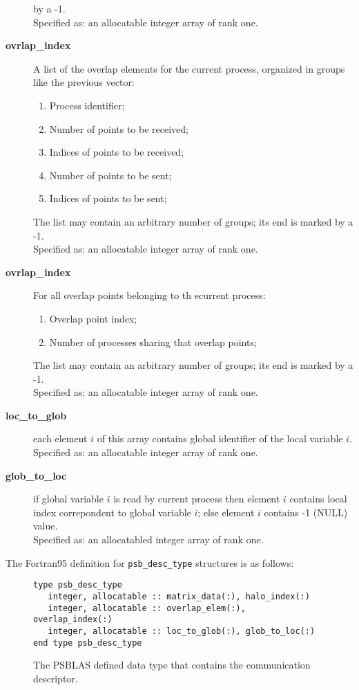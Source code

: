 \begin{description}
by a -1.\\
Specified as: an allocatable integer array of rank one.
\item [{\bf ovrlap\_index}] A list of the overlap elements for the
current process, organized in groups like the previous vector:
\begin{enumerate}
\item Process identifier;
\item Number of points to be received;
\item Indices of points to be received;
\item Number of points to be sent;
\item Indices of points to be sent;
\end{enumerate}
The list may contain an arbitrary number of groups; its end is marked
by a -1.\\
Specified as: an allocatable integer array  of rank one.
\item [{\bf ovrlap\_index}] For all overlap points belonging to th
ecurrent process:
\begin{enumerate}
\item  Overlap point index;
\item  Number of processes sharing that overlap points;
\end{enumerate}
The list may contain an arbitrary number of groups; its end is marked
by a -1.\\
Specified as: an allocatable integer array of rank one.
\item[{\bf loc\_to\_glob}] each element $i$ of this array contains
global identifier of the local variable $i$.\\
Specified as: an allocatable integer array of rank one.
\item[{\bf glob\_to\_loc}]  if global variable $i$ is read by current
process then element $i$ contains local index correpondent to global variable $i$;
else element $i$ contains -1 (NULL) value.\\
Specified as: an allocatabled integer array of rank one.
\end{description}
The Fortran95 definition  for \verb|psb_desc_type| structures is 
as follows:
\begin{figure}[h!]
  \begin{Sbox}
    \begin{minipage}[tl]{0.9\textwidth}
\begin{verbatim} 
type psb_desc_type 
   integer, allocatable :: matrix_data(:), halo_index(:)
   integer, allocatable :: overlap_elem(:), overlap_index(:)
   integer, allocatable :: loc_to_glob(:), glob_to_loc(:)
end type psb_desc_type 
\end{verbatim}
    \end{minipage}
  \end{Sbox}
  \setlength{\fboxsep}{8pt}
  \begin{center}
    \fbox{\TheSbox}
  \end{center}
  \caption{\label{fig:desctype}The PSBLAS defined data type that
    contains the communication descriptor.}
\end{figure}

